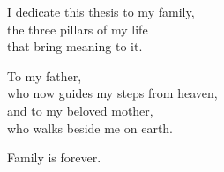 
\thispagestyle{empty}
\vspace*{0.14\textheight}

\begin{flushright}
  \itshape
  \begin{minipage}{0.70\textwidth}
    \begin{flushright}
      I dedicate this thesis to my family,\\
      the three pillars of my life\\
      that bring meaning to it.

      \vspace{1.2em}

      To my father,\\
      who now guides my steps from heaven,\\
      and to my beloved mother,\\
      who walks beside me on earth.

      \medskip
      Family is forever.
    \end{flushright}
  \end{minipage}
\end{flushright}

\vfill
\clearpage
